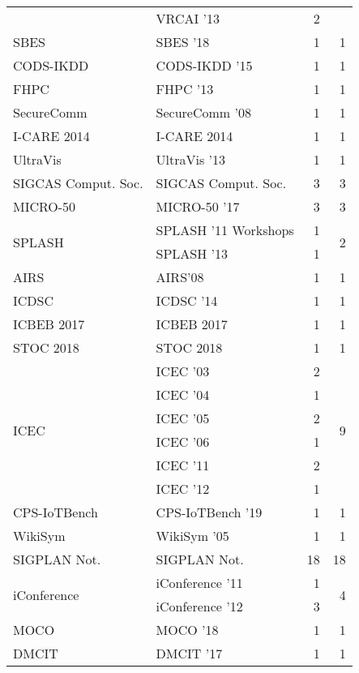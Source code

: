 \begin{table*}[t]
\begin{tabular}{llrr}
& VRCAI '13 & 2 &\\
\multirow{1}{*}{SBES } & SBES '18 & 1 & \multirow{1}{*}{1}\\
\multirow{1}{*}{CODS-IKDD } & CODS-IKDD '15 & 1 & \multirow{1}{*}{1}\\
\multirow{1}{*}{FHPC } & FHPC '13 & 1 & \multirow{1}{*}{1}\\
\multirow{1}{*}{SecureComm } & SecureComm '08 & 1 & \multirow{1}{*}{1}\\
\multirow{1}{*}{I-CARE 2014} & I-CARE 2014 & 1 & \multirow{1}{*}{1}\\
\multirow{1}{*}{UltraVis } & UltraVis '13 & 1 & \multirow{1}{*}{1}\\
\multirow{1}{*}{SIGCAS Comput. Soc.} & SIGCAS Comput. Soc. & 3 & \multirow{1}{*}{3}\\
\multirow{1}{*}{MICRO-50 } & MICRO-50 '17 & 3 & \multirow{1}{*}{3}\\
\multirow{2}{*}{SPLASH } & SPLASH '11 Workshops & 1 & \multirow{2}{*}{2}\\
& SPLASH '13 & 1 &\\
\multirow{1}{*}{AIRS} & AIRS'08 & 1 & \multirow{1}{*}{1}\\
\multirow{1}{*}{ICDSC } & ICDSC '14 & 1 & \multirow{1}{*}{1}\\
\multirow{1}{*}{ICBEB 2017} & ICBEB 2017 & 1 & \multirow{1}{*}{1}\\
\multirow{1}{*}{STOC 2018} & STOC 2018 & 1 & \multirow{1}{*}{1}\\
\multirow{6}{*}{ICEC } & ICEC '03 & 2 & \multirow{6}{*}{9}\\
& ICEC '04 & 1 &\\
& ICEC '05 & 2 &\\
& ICEC '06 & 1 &\\
& ICEC '11 & 2 &\\
& ICEC '12 & 1 &\\
\multirow{1}{*}{CPS-IoTBench } & CPS-IoTBench '19 & 1 & \multirow{1}{*}{1}\\
\multirow{1}{*}{WikiSym } & WikiSym '05 & 1 & \multirow{1}{*}{1}\\
\multirow{1}{*}{SIGPLAN Not.} & SIGPLAN Not. & 18 & \multirow{1}{*}{18}\\
\multirow{2}{*}{iConference } & iConference '11 & 1 & \multirow{2}{*}{4}\\
& iConference '12 & 3 &\\
\multirow{1}{*}{MOCO } & MOCO '18 & 1 & \multirow{1}{*}{1}\\
\multirow{1}{*}{DMCIT } & DMCIT '17 & 1 & \multirow{1}{*}{1}\\

\end{tabular}
\end{table*}

